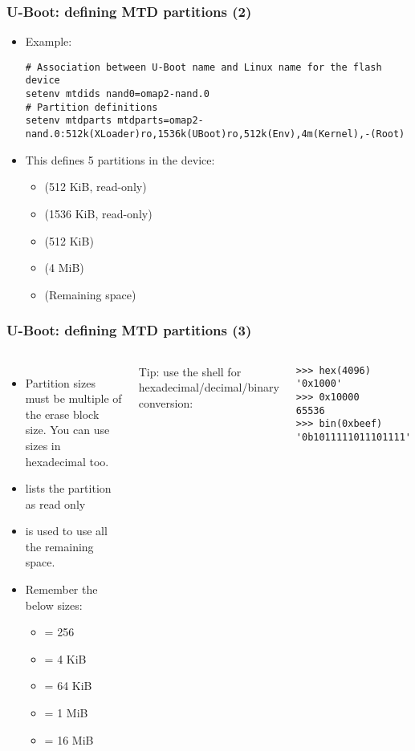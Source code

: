 \begin{frame}[fragile]
  \frametitle{U-Boot: defining MTD partitions (2)}
  \begin{itemize}
  \item Example:
  {\scriptsize
  \begin{verbatim}
# Association between U-Boot name and Linux name for the flash device
setenv mtdids nand0=omap2-nand.0
# Partition definitions
setenv mtdparts mtdparts=omap2-nand.0:512k(XLoader)ro,1536k(UBoot)ro,512k(Env),4m(Kernel),-(Root)
  \end{verbatim}
  }
  \item This defines 5 partitions in the  device:
    \begin{itemize}
    \item {} (512 KiB, read-only)
    \item {} (1536 KiB, read-only)
    \item {} (512 KiB)
    \item {} (4 MiB)
    \item {} (Remaining space)
    \end{itemize}
  \end{itemize}
\end{frame}

\begin{frame}[fragile]
  \frametitle{U-Boot: defining MTD partitions (3)}
  \begin{columns}
    \begin{itemize}
    \item Partition sizes must be multiple of the erase block size.
      You can use sizes in hexadecimal too.
    \item {} lists the partition as read only
    \item \code{-} is used to use all the remaining space.
    \item Remember the below sizes:
    \begin{itemize}
      \item {} = 256
      \item {} = 4 KiB
      \item {} = 64 KiB
      \item {} = 1 MiB
      \item {} = 16 MiB
    \end{itemize}
    \end{itemize}
    Tip: use the  shell for hexadecimal/decimal/binary conversion:
    \begin{block}{}
    \begin{verbatim}
>>> hex(4096)
'0x1000'
>>> 0x10000
65536
>>> bin(0xbeef)
'0b1011111011101111'
    \end{verbatim}
    \end{block}
  \end{columns}
\end{frame}


